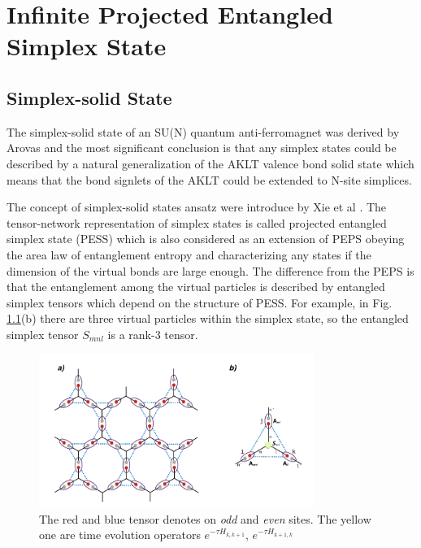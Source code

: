 \chapter{Infinite Projected Entangled Simplex State}
\label{chapter:ipess}
\section{Simplex-solid State}
\label{solidstate}
The simplex-solid state of an SU(N) quantum anti-ferromagnet was derived by Arovas \cite{} and the most significant conclusion is that any simplex states could be described by a natural generalization of the AKLT \cite{} valence bond solid state which means that the bond signlets of the AKLT could be extended to N-site simplices.

The concept of simplex-solid states ansatz were introduce by Xie et al \cite{}. The tensor-network representation of simplex states is called projected entangled simplex state (PESS) which is also considered as an extension of PEPS \cite{} obeying the area law of entanglement entropy and characterizing any states if the dimension of the virtual bonds are large enough. The difference from the PEPS is that the entanglement among the virtual particles is described by entangled simplex tensors which depend on the structure of PESS. For example, in Fig. \ref{fig411}(b) there are three virtual particles within the simplex state, so the entangled simplex tensor $S_{mnl}$ is a rank-3 tensor.

\begin{figure}[ht]
	\centering
	\includegraphics[width=0.80\textwidth]{figures/fig411.png}
	\caption[The picture of the main idea of itebd.]{The red and blue tensor denotes on \textit{odd} and \textit{even} sites. The yellow one are time evolution operators $e^{-\tau H_{k,k+1}}$, $e^{-\tau H_{k+1,k}}$}
	\label{fig411}
\end{figure}

